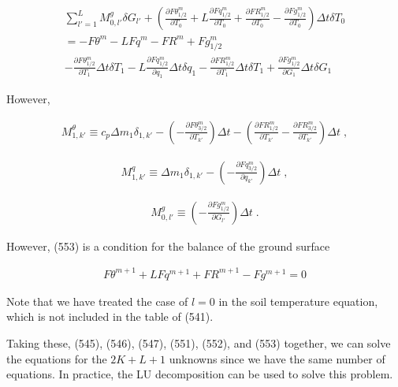 \begin{eqnarray}
  {\sum_{l'=1}^{L} M^g_{0,l'} \delta G_{l'}
           +  \left(    \frac{\partial{F\theta^{m}_{1/2}}}{\partial {T_0}}
           +  L \frac{\partial{Fq^{m}_{1/2}}}{\partial {T_0}}
           +    \frac{\partial{FR^{m}_{1/2}}}{\partial {T_0}}
           -  \frac{\partial{Fg^{m}_{1/2}}}{\partial {T_0}} \right) \Delta t\delta T_0  }
         \\
         =  - F\theta^{m} - L Fq^{m} - FR^{m} +  Fg^{m}_{1/2}  \\
         -    \frac{\partial{F\theta^{m}_{1/2}}}{\partial {T_1}} \Delta t\delta T_1
           -  L \frac{\partial{Fq^{m}_{1/2}}}{\partial {q_1}} \Delta t\delta q_1
           -    \frac{\partial{FR^{m}_{1/2}}}{\partial {T_1}} \Delta t\delta T_1
           +    \frac{\partial{Fg^{m}_{1/2}}}{\partial {G_1}} \Delta t\delta G_1
\end{eqnarray}

However,

\begin{eqnarray}
M^{\theta}_{1,k'} \equiv c_p \Delta m_1 \delta_{1,k'}
          -  \left(
                   - \frac{\partial{F\theta^{m}_{3/2}}}{\partial {T_{k'}}} \right) \Delta t
          -  \left( \frac{\partial{FR^{m}_{1/2}}}{\partial {T_{k'}}}
                   - \frac{\partial{FR^{m}_{3/2}}}{\partial {T_{k'}}} \right) \Delta t \; ,
\end{eqnarray}

\begin{eqnarray}
M^{q}_{1,k'} \equiv \Delta m_1 \delta_{1,k'}
          -  \left(
                   - \frac{\partial{Fq^{m}_{3/2}}}{\partial {q_{k'}}} \right) \Delta t \; ,
\end{eqnarray}

\begin{eqnarray}
M^{g}_{0,l'} \equiv
             \left(
                   - \frac{\partial{Fg^{m}_{1/2}}}{\partial {G_{l'}}} \right) \Delta t \; .
\end{eqnarray}

However, (553) is a condition for the balance of the ground surface

\begin{eqnarray}
   F\theta^{m+1} + L Fq^{m+1} + FR^{m+1} - Fg^{m+1} = 0
\end{eqnarray}

Note that we have treated the case of \(l=0\) in the soil temperature
equation, which is not included in the table of (541).

Taking these, (545), (546), (547), (551), (552), and (553) together, we
can solve the equations for the \(2K+L+1\) unknowns since we have the
same number of equations. In practice, the LU decomposition can be used
to solve this problem.

